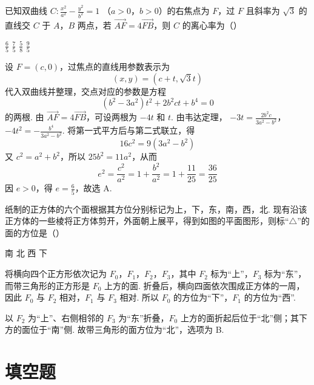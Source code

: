 \begin{problem}
已知双曲线 \(C: \frac{x^2}{a^2} - \frac{y^2}{b^2} = 1 \) （\(a > 0\)，\(b > 0\)）的右焦点为 \(F\)，过 \(F\) 且斜率为 \(\sqrt{3}\) 的直线交 \(C\) 于 \(A\)，\(B\) 两点，若 \(\overrightarrow{AF} = 4\overrightarrow{FB}\)，则 \(C\) 的离心率为（\quad）

\choices
    {\( \frac{6}{5} \)}
    {\( \frac{7}{5} \)}
    {\( \frac{5}{8} \)}
    {\( \frac{9}{5} \)}

\begin{solution}
设 \(F=(c,0)\)，过焦点的直线用参数表示为
\[
(x,y)=(c+t,\sqrt3t)
\]
代入双曲线并整理，交点对应的参数是方程
\[
(b^{2}-3a^{2})t^{2}+2b^{2}ct+b^{4}=0
\]
的两根. 由 \(\overrightarrow{AF}=4\overrightarrow{FB}\)，可设两根为 \(-4t\) 和 \(t\). 由韦达定理，
\(-3t=\frac{2b^{2}c}{3a^{2}-b^{2}}\)，\(-4t^{2}=-\frac{b^{4}}{3a^{2}-b^{2}}\).
将第一式平方后与第二式联立，得
\[
16c^{2}=9(3a^{2}-b^{2})
\]
又 \(c^{2}=a^{2}+b^{2}\)，所以 \(25b^{2}=11a^{2}\)，从而
\[
e^{2}=\frac{c^{2}}{a^{2}}=1+\frac{b^{2}}{a^{2}}=1+\frac{11}{25}=\frac{36}{25}
\]
因 \(e>0\)，得 \(e=\frac65\)，故选 A.
\end{solution}
\end{problem}

\begin{problem}
纸制的正方体的六个面根据其方位分别标记为上，下，东，南，西，北. 现有沿该正方体的一些棱将正方体剪开，外面朝上展平，得到如图的平面图形，则标“\(\triangle\)”的面的方位是（\quad）


\choices
    {南}
    {北}
    {西}
    {下}

\begin{solution}
将横向四个正方形依次记为 \(F_{0}\)，\(F_{1}\)，\(F_{2}\)，\(F_{3}\)，其中 \(F_{2}\) 标为“上”，\(F_{3}\) 标为“东”，而带三角形的正方形是 \(F_{0}\) 上方的面. 折叠后，横向四面依次围成正方体的一周，因此 \(F_{0}\) 与 \(F_{2}\) 相对，\(F_{1}\) 与 \(F_{3}\) 相对. 所以 \(F_{0}\) 的方位为“下”，\(F_{1}\) 的方位为“西”.

以 \(F_{2}\) 为“上”、右侧相邻的 \(F_{3}\) 为“东”折叠，\(F_{0}\) 上方的面折起后位于“北”侧；其下方的面位于“南”侧. 故带三角形的面方位为“北”，选项为 B.
\end{solution}
\end{problem}

\section{填空题}

